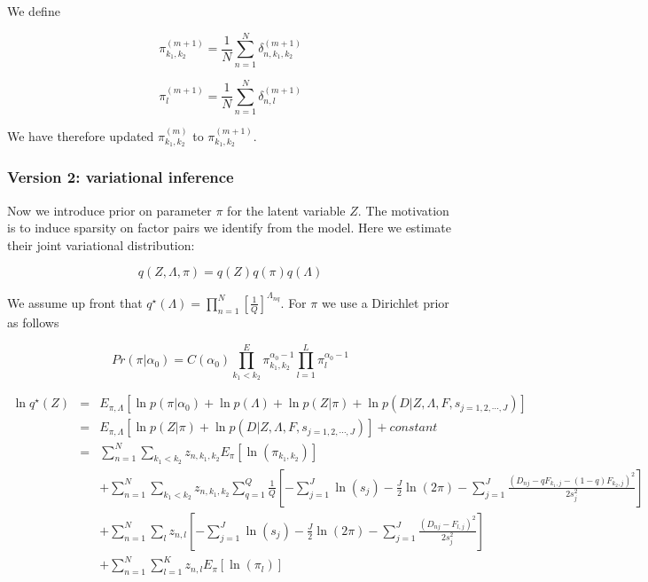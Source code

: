 \documentclass[11pt,authoryear]{article}
\begin{document}
We define

$$ \pi^{(m+1)}_{k_1, k_2} = \frac{1}{N}\sum_{n=1}^{N} \delta^{(m+1)}_{n, k_1, k_2} $$

$$ \pi^{(m+1)}_{l} = \frac{1}{N}\sum_{n=1}^{N} \delta^{(m+1)}_{n, l} $$

We have therefore updated $\pi^{(m)}_{k_1, k_2}$ to $\pi^{(m+1)}_{k_1, k_2}$.

\subsubsection{Version 2: variational inference}

Now we introduce prior on parameter $\pi$ for the latent variable $Z$. The
motivation is to induce sparsity on factor pairs we identify from the model.  
Here we estimate their joint variational distribution:

$$ q(Z, \Lambda, \pi) = q(Z) q(\pi) q(\Lambda) $$

We assume up front that $q^{\star}(\Lambda) = \prod_{n=1}^{N} \left [
  \frac{1}{Q} \right ]^{\Lambda_{nq}} $. For $\pi$ we use a Dirichlet prior as follows

$$ Pr (\pi | \alpha_{0}) = C (\alpha_0) \prod_{k_1 < k_2}^E \pi_{k_1, k_2}^{\alpha_0 -1} \prod_{l=1}^{L} \pi_{l}^{\alpha_0 -1}$$

\begin{eqnarray}
\ln q^{\star} (Z)  & = & E_{\pi, \Lambda} \left [ \ln p(\pi|\alpha_0) + \ln p(\Lambda) + \ln p(Z | \pi) + \ln p(D | Z, \Lambda, F, s_{j=1,2,\cdots,J}) \right ] \\ \nonumber
  & = & E_{\pi, \Lambda} \left [ \ln p(Z | \pi) + \ln p(D | Z, \Lambda, F, s_{j=1,2,\cdots,J}) \right] + constant \\\nonumber
  & = & \sum_{n=1}^{N} \sum_{k_1 < k_2}  z_{n, k_1, k_2} E_{\pi} \left [ \ln (\pi_{k_1, k_2}) \right ] \\ \nonumber
  &&  + \sum_{n=1}^{N} \sum_{k_1 < k_2}  z_{n, k_1, k_2} \sum_{q=1}^{Q} \frac{1}{Q} \left [ - \sum_{j=1}^{J} \ln (s_j) - \frac{J}{2} \ln (2 \pi) - \sum_{j=1}^{J} \frac{(D_{nj} - qF_{k_1,j} - (1-q)F_{k_2,j})^2}{2s^2_j} \right] \\ \nonumber
  &&  +  \sum_{n=1}^{N} \sum_{l}  z_{n, l} \left [ - \sum_{j=1}^{J} \ln (s_j) - \frac{J}{2} \ln (2 \pi) - \sum_{j=1}^{J} \frac{(D_{nj} - F_{l,j} )^2}{2s^2_j} \right] \\ \nonumber 
  && +  \sum_{n=1}^{N} \sum_{l=1}^{K} z_{n, l} E_{\pi} \left [ \ln (\pi_{l}) \right ] \\ \nonumber
\end{eqnarray}
\end{document}
